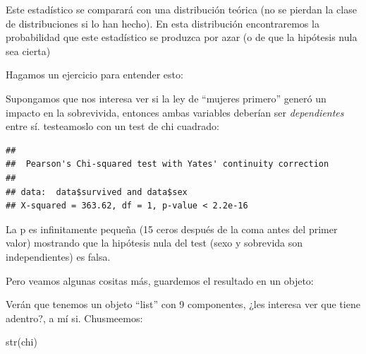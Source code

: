\documentclass[
]{book}
\newenvironment{Shaded}{\begin{snugshade}}{\end{snugshade}}
\newcommand{\FunctionTok}[1]{\textcolor[rgb]{0.00,0.00,0.00}{#1}}
\newcommand{\NormalTok}[1]{#1}
\newcommand{\OtherTok}[1]{\textcolor[rgb]{0.56,0.35,0.01}{#1}}
\newcommand{\SpecialCharTok}[1]{\textcolor[rgb]{0.00,0.00,0.00}{#1}}
\begin{document}
Este estadístico se comparará con una distribución teórica (no se pierdan la clase de distribuciones si lo han hecho). En esta distribución encontraremos la probabilidad que este estadístico se produzca por azar (o de que la hipótesis nula sea cierta)

Hagamos un ejercicio para entender esto:

Supongamos que nos interesa ver si la ley de ``mujeres primero'' generó un impacto en la sobrevivida, entonces ambas variables deberían ser \emph{dependientes} entre sí. testeamoslo con un test de chi cuadrado:

\begin{Shaded}
\end{Shaded}

\begin{verbatim}
## 
##  Pearson's Chi-squared test with Yates' continuity correction
## 
## data:  data$survived and data$sex
## X-squared = 363.62, df = 1, p-value < 2.2e-16
\end{verbatim}

La p es infinitamente pequeña (15 ceros después de la coma antes del primer valor) mostrando que la hipótesis nula del test (sexo y sobrevida son independientes) es falsa.

Pero veamos algunas cositas más, guardemos el resultado en un objeto:

\begin{Shaded}
\end{Shaded}

Verán que tenemos un objeto ``list'' con 9 componentes, ¿les interesa ver que tiene adentro?, a mí si. Chusmeemos:

\begin{Shaded}
\begin{Highlighting}[]
\FunctionTok{str}\NormalTok{(chi)}
\end{Highlighting}
\end{Shaded}
\end{document}
